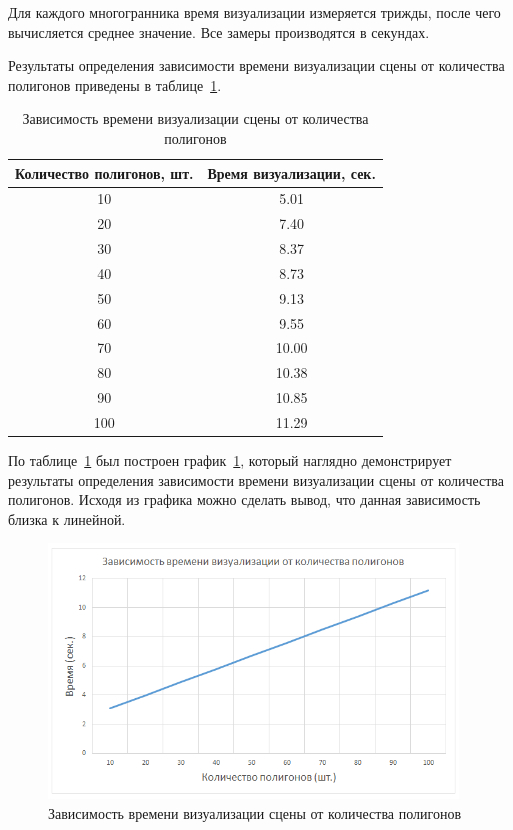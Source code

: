 Для каждого многогранника время визуализации измеряется трижды, после чего вычисляется среднее значение. Все замеры производятся в секундах.

Результаты определения зависимости времени визуализации сцены от количества полигонов приведены в таблице~\ref{tbl:research1}.

\begin{table}[h]
	\small
	\centering
	\caption{Зависимость времени визуализации сцены от количества полигонов}
	\begin{tabular}{|c|c|}
		\hline
		\textbf{Количество полигонов, шт.} & \textbf{Время визуализации, сек.} \\
		\hline
		10  & 5.01 \\
		20  & 7.40 \\
		30  & 8.37 \\
		40  & 8.73 \\
		50  & 9.13 \\
		60  & 9.55 \\
		70  & 10.00 \\
		80  & 10.38 \\
		90  & 10.85 \\
		100 & 11.29 \\
		\hline
	\end{tabular}
	\label{tbl:research1}
\end{table}

По таблице~\ref{tbl:research1} был построен график~\ref{fig:research1}, который наглядно демонстрирует результаты определения зависимости времени визуализации сцены от количества полигонов. Исходя из графика можно сделать вывод, что данная зависимость близка к линейной.

\begin{figure}[h] 
	\centering
	\includegraphics[width=0.97\textwidth]{images/research1.png}
	\caption{Зависимость времени визуализации сцены от количества полигонов} 
	\label{fig:research1} 
\end{figure}

